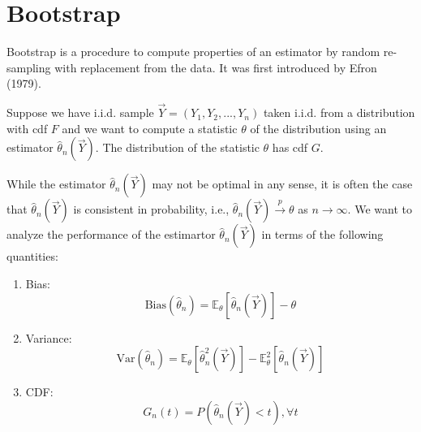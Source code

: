 \documentclass[11pt]{elegantbook}
\begin{document}
\chapter{Bootstrap}
Bootstrap is a procedure to compute properties of an estimator by random re-sampling with replacement from the data. It was first introduced by Efron (1979).

Suppose we have i.i.d. sample $\vec{Y}=(Y_1,Y_2,...,Y_n)$ taken i.i.d. from a distribution with cdf $F$ and we want to compute a statistic $\theta$ of the distribution using an estimator $\hat{\theta}_n(\vec{Y})$. The distribution of the statistic $\theta$ has cdf $G$.

While the estimator $\hat{\theta}_n(\vec{Y})$ may not be optimal in any sense, it is often the case that $\hat{\theta}_n(\vec{Y})$ is consistent in probability, i.e., $\hat{\theta}_n(\vec{Y}) \stackrel{p}{\longrightarrow} \theta$ as $n \rightarrow \infty$. We want to analyze the performance of the estimartor $\hat{\theta}_n(\vec{Y})$ in terms of the following quantities:
\begin{enumerate}[(1).]
    \item Bias: $$\text{Bias}(\hat{\theta}_n)= \mathbb{E}_{\theta}[\hat{\theta}_n(\vec{Y})]-\theta$$
    \item Variance: $$\text{Var}(\hat{\theta}_n)=\mathbb{E}_{\theta}[\hat{\theta}_n^2(\vec{Y})]-\mathbb{E}_{\theta}^2[\hat{\theta}_n(\vec{Y})]$$
    \item CDF: $$G_{n}(t)=P(\hat{\theta}_n(\vec{Y})<t),\forall t$$
\end{enumerate}
\end{document}
